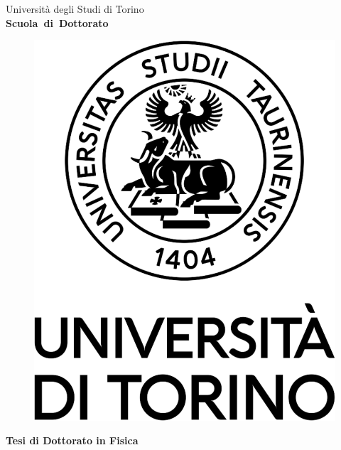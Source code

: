 \begin{titlepage}
\thispagestyle{empty}

\begin{center}

\begin{large}
Universit\`a degli Studi di Torino \\
\textbf{Scuola~di~Dottorato}
\end{large}

\hrulefill

\large{\strut}

\vspace{0.5cm}
\begin{figure}[h]
  \centering
  \includegraphics[width=.2\textheight]{Figures/logo_sigillo_verticale_cover.pdf}
\end{figure}

\vspace{1cm}

\Large{\textbf{Tesi di Dottorato in Fisica}}

\vspace{1cm}

\LARGE{\textbf{\thetitle}}\\

\vspace{1.5cm}

\Large{\textbf{\theauthor}}

\vspace*{\fill}

\end{center}
\end{titlepage}
